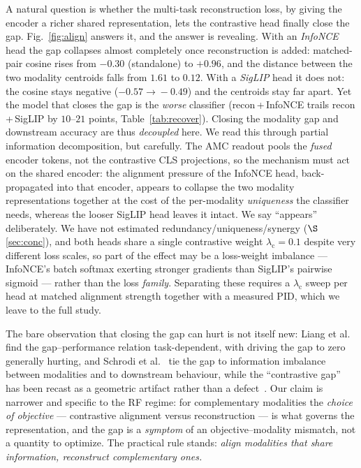 \documentclass[conference]{IEEEtran}
\begin{document}
A natural question is whether the multi-task reconstruction loss, by giving the
encoder a richer shared representation, lets the contrastive head finally close the
gap. Fig.~\ref{fig:align} answers it, and the answer is revealing. With an
\emph{InfoNCE} head the gap collapses almost completely once reconstruction is added:
matched-pair cosine rises from $-0.30$ (standalone) to $+0.96$, and the distance
between the two modality centroids falls from $1.61$ to $0.12$. With a \emph{SigLIP}
head it does not: the cosine stays negative ($-0.57\!\to\!-0.49$) and the centroids
stay far apart. Yet the model that closes the gap is the \emph{worse} classifier
(recon\,+\,InfoNCE trails recon\,+\,SigLIP by $10$--$21$ points, Table~\ref{tab:recover}).
Closing the modality gap and downstream accuracy are thus \emph{decoupled} here. We
read this through partial information decomposition, but carefully. The AMC readout
pools the \emph{fused} encoder tokens, not the contrastive CLS projections, so the
mechanism must act on the shared encoder: the alignment pressure of the InfoNCE head,
back-propagated into that encoder, appears to collapse the two modality
representations together at the cost of the per-modality \emph{uniqueness} the
classifier needs, whereas the looser SigLIP head leaves it intact. We say
``appears'' deliberately. We have not estimated redundancy/uniqueness/synergy
($\S$\ref{sec:conc}), and both heads share a single contrastive weight
$\lambda_{\text{c}}{=}0.1$ despite very different loss scales, so part of the effect
may be a loss-weight imbalance --- InfoNCE's batch softmax exerting stronger
gradients than SigLIP's pairwise sigmoid --- rather than the loss \emph{family}.
Separating these requires a $\lambda_{\text{c}}$ sweep per head at matched alignment
strength together with a measured PID, which we leave to the full study.

The bare observation that closing the gap can hurt is not itself new: Liang et
al.~\cite{modgap} find the gap--performance relation task-dependent, with driving the
gap to zero generally hurting, and Schrodi et al.~\cite{schrodi} tie the gap to
information imbalance between modalities and to downstream behaviour, while the
``contrastive gap'' has been recast as a geometric artifact rather than a
defect~\cite{fahim}. Our claim is narrower and specific to the RF regime: for
complementary modalities the \emph{choice of objective} --- contrastive alignment
versus reconstruction --- is what governs the representation, and the gap is a
\emph{symptom} of an objective--modality mismatch, not a quantity to optimize. The
practical rule stands: \emph{align modalities that share information, reconstruct
complementary ones.}
\end{document}
